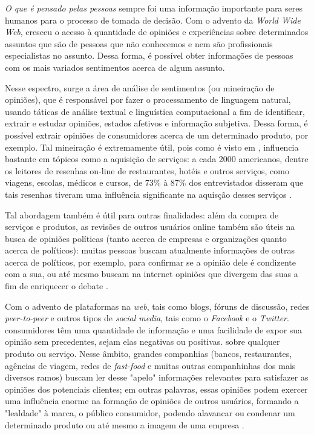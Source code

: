 \textit{O que é pensado pelas pessoas} sempre foi uma informação importante para seres humanos para o processo de tomada de decisão. Com o advento da \emph{World Wide Web}, cresceu o acesso à quantidade de opiniões e experiências sobre determinados assuntos que são de pessoas que não conhecemos e nem são profissionais especialistas no assunto. Dessa forma, é possível obter informações de pessoas com os mais variados sentimentos acerca de algum assunto.

Nesse espectro, surge a área de análise de sentimentos (ou mineiração de opiniões), que é responsável por fazer o processamento de linguagem natural, usando táticas de análise textual e linguística computacional a fim de identificar, extrair e estudar opiniões, estados afetivos e informação subjetiva. Dessa forma, é possível extrair opiniões de consumidores acerca de um determinado produto, por exemplo. Tal mineiração é extremamente útil, pois como é visto em  \cite{pang2008opinion}, influencia bastante em tópicos como a aquisição de serviços: a cada 2000 americanos, dentre os leitores de resenhas on-line de restaurantes, hotéis e outros serviços, como viagens, escolas, médicos e cursos, de 73\% à 87\% dos entrevistados disseram que tais resenhas tiveram uma influência significante na aquisção desses serviços \cite{zhu2010impact}.

Tal abordagem também é útil para outras finalidades: além da compra de serviços e produtos, as revisões de outros usuários online também são úteis na busca de opiniões políticas (tanto acerca de empresas e organizações quanto acerca de políticos): muitas pessoas buscam atualmente informações de outras acerca de políticos, por exemplo, para confirmar se a opinião dele é condizente com a sua, ou até mesmo buscam na internet opiniões que divergem das suas a fim de enriquecer o debate \cite{gil2009weblogs}.

Com o advento de plataformas na \emph{web}, tais como blogs, fóruns de discussão, redes \emph{peer-to-peer} e outros tipos de \emph{social media}, tais como o \emph{Facebook} e o \emph{Twitter}. consumidores têm uma quantidade de informação e uma facilidade de expor sua opinião sem precedentes, sejam elas negativas ou positivas. sobre qualquer produto ou serviço. Nesse âmbito, grandes companhias (bancos, restaurantes, agências de viagem, redes de \emph{fast-food} e muitas outras companhinhas dos mais diversos ramos) buscam ler desse "apelo" informações relevantes para satisfazer as opiniões dos potenciais clientes; em outras palavras, essas opiniões podem exercer uma influência enorme na formação de opiniões de outros usuários, formando a "lealdade" à marca, o público consumidor, podendo alavancar ou condenar um determinado produto ou até mesmo a imagem de uma empresa \cite{hoffman2008online}.
